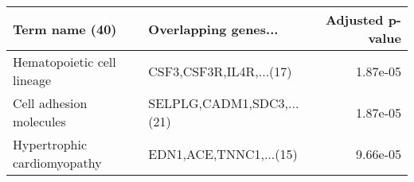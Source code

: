\begin{tabular}{llr}
\toprule
             Term name (40) &      Overlapping genes... &  Adjusted p-value \\
\midrule
 Hematopoietic cell lineage &   CSF3,CSF3R,IL4R,...(17) &          1.87e-05 \\
    Cell adhesion molecules & SELPLG,CADM1,SDC3,...(21) &          1.87e-05 \\
Hypertrophic cardiomyopathy &    EDN1,ACE,TNNC1,...(15) &          9.66e-05 \\
\bottomrule
\end{tabular}
